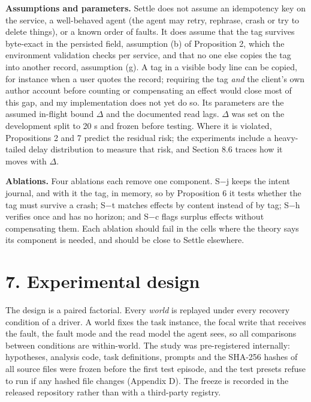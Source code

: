 \documentclass[
  10pt,
]{article}
\begin{document}
\textbf{Assumptions and parameters.} Settle does not assume an
idempotency key on the service, a well-behaved agent (the agent may
retry, rephrase, crash or try to delete things), or a known order of
faults. It does assume that the tag survives byte-exact in the persisted
field, assumption (b) of Proposition 2, which the environment validation
checks per service, and that no one else copies the tag into another
record, assumption (g). A tag in a visible body line can be copied, for
instance when a user quotes the record; requiring the tag \emph{and} the
client's own author account before counting or compensating an effect
would close most of this gap, and my implementation does not yet do so.
Its parameters are the assumed in-flight bound \(\Delta\) and the
documented read lags. \(\Delta\) was set on the development split to 20
s and frozen before testing. Where it is violated, Propositions 2 and 7
predict the residual risk; the experiments include a heavy-tailed delay
distribution to measure that risk, and Section 8.6 traces how it moves
with \(\Delta\).

\textbf{Ablations.} Four ablations each remove one component. S−j keeps
the intent journal, and with it the tag, in memory, so by Proposition 6
it tests whether the tag must survive a crash; S−t matches effects by
content instead of by tag; S−h verifies once and has no horizon; and S−c
flags surplus effects without compensating them. Each ablation should
fail in the cells where the theory says its component is needed, and
should be close to Settle elsewhere.

\hypertarget{experimental-design}{%
\section*{7. Experimental design}\label{experimental-design}}

The design is a paired factorial. Every \emph{world} is replayed under
every recovery condition of a driver. A world fixes the task instance,
the focal write that receives the fault, the fault mode and the read
model the agent sees, so all comparisons between conditions are
within-world. The study was pre-registered internally: hypotheses,
analysis code, task definitions, prompts and the SHA-256 hashes of all
source files were frozen before the first test episode, and the test
presets refuse to run if any hashed file changes (Appendix D). The
freeze is recorded in the released repository rather than with a
third-party registry.
\end{document}
